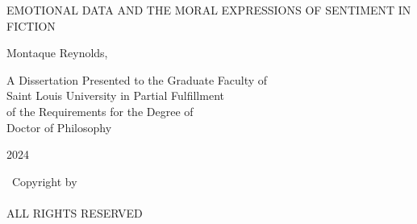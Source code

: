 \documentclass[phdthesis,12pt,final]{wuthesis}
\theoremstyle{definition}
\theoremstyle{definition}
\theoremstyle{definition}
\theoremstyle{definition}
\theoremstyle{remark}
\begin{document}
\begin{titlepage}
\begin{center}
\vspace*{0.5in} %

{\large\MakeUppercase{Emotional Data and The Moral Expressions of Sentiment in Fiction}\par}

\vspace{1.7in} %

{\large Montaque Reynolds, \thesisauthorpreviousdegrees\par}

\vspace{3in} %

A Dissertation Presented to the Graduate Faculty of\\
Saint Louis University in Partial Fulfillment\\
of the Requirements for the Degree of\\
Doctor of Philosophy

\vfill %

2024

\end{center}
\end{titlepage}

\setcounter{page}{2}

\cleardoublepage
\thispagestyle{empty}
\begin{thesiscopyrightpage}
    \vspace*{\fill}
    \begin{center}
    \textcopyright\ Copyright by\\
    \thesisauthor\\
    ALL RIGHTS RESERVED\\
    \thesisyear
    \end{center}
    \vspace*{-10cm} %
\end{thesiscopyrightpage}

\cleardoublepage
\thispagestyle{empty}

\vspace*{\fill}

\noindent\thesiscommittee

\vspace*{10cm} %
\end{document}
